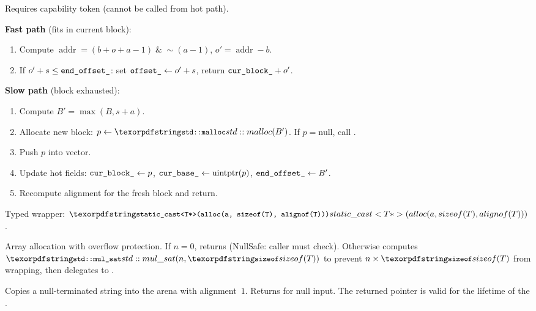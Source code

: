 \begin{algorithm_spec}
\label{alg:arena-alloc}
Requires capability token  (cannot be called from hot path).

\textbf{Fast path} (fits in current block):
\begin{enumerate}
  \item Compute $\operatorname{addr} = (b + o + a - 1) \;\mathbin{\&}\; {\sim}(a-1)$,
        $o' = \operatorname{addr} - b$.
  \item If $o' + s \le \texttt{end\_offset\_}$: set
        $\texttt{offset\_} \leftarrow o' + s$, return $\texttt{cur\_block\_} + o'$.
\end{enumerate}

\textbf{Slow path} (block exhausted):
\begin{enumerate}
  \item Compute $B' = \max(B, s + a)$.
  \item Allocate new block: $p \leftarrow \code{std::malloc}(B')$.
        If $p = \text{null}$, call .
  \item Push $p$ into  vector.
  \item Update hot fields: $\texttt{cur\_block\_} \leftarrow p$,
        $\texttt{cur\_base\_} \leftarrow \operatorname{uintptr}(p)$,
        $\texttt{end\_offset\_} \leftarrow B'$.
  \item Recompute alignment for the fresh block and return.
\end{enumerate}
\end{algorithm_spec}

\begin{algorithm_spec}
Typed wrapper: $\code{static\_cast<T*>(alloc(a, sizeof(T), alignof(T)))}$.
\end{algorithm_spec}

\begin{algorithm_spec}
Array allocation with overflow protection.
If $n = 0$, returns  (NullSafe: caller must check).
Otherwise computes $\code{std::mul\_sat}(n, \code{sizeof}(T))$ to prevent
$n \times \code{sizeof}(T)$ from wrapping, then delegates to .
\end{algorithm_spec}

\begin{algorithm_spec}
Copies a null-terminated string into the arena with alignment~$1$.
Returns  for null input.
The returned pointer is valid for the lifetime of the .
\end{algorithm_spec}

